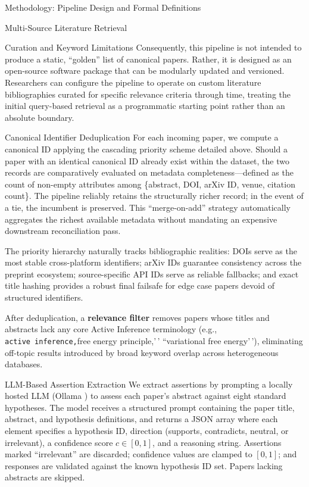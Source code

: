 \documentclass[
  ignorenonframetext,
]{beamer}
\begin{document}
\begin{frame}[fragile]{Methodology: Pipeline Design and Formal
Definitions}
\begin{block}{Multi-Source Literature Retrieval}
\begin{block}{Curation and Keyword Limitations}
Consequently, this pipeline is not intended to produce a static,
``golden'' list of canonical papers. Rather, it is designed as an
open-source software package that can be modularly updated and
versioned. Researchers can configure the pipeline to operate on custom
literature bibliographies curated for specific relevance criteria
through time, treating the initial query-based retrieval as a
programmatic starting point rather than an absolute boundary.
\end{block}
\end{block}

\begin{block}{Canonical Identifier Deduplication}
\protect{}\label{canonical-identifier-deduplication}
For each incoming paper, we compute a canonical ID applying the
cascading priority scheme detailed above. Should a paper with an
identical canonical ID already exist within the dataset, the two records
are comparatively evaluated on metadata completeness---defined as the
count of non-empty attributes among \{abstract, DOI, arXiv ID, venue,
citation count\}. The pipeline reliably retains the structurally richer
record; in the event of a tie, the incumbent is preserved. This
``merge-on-add'' strategy automatically aggregates the richest available
metadata without mandating an expensive downstream reconciliation pass.

The priority hierarchy naturally tracks bibliographic realities: DOIs
serve as the most stable cross-platform identifiers; arXiv IDs guarantee
consistency across the preprint ecosystem; source-specific API IDs serve
as reliable fallbacks; and exact title hashing provides a robust final
failsafe for edge case papers devoid of structured identifiers.

After deduplication, a \textbf{relevance filter} removes papers whose
titles and abstracts lack any core Active Inference terminology (e.g.,
\texttt{active\ inference,\textquotesingle{}\textquotesingle{}}free
energy principle,'\,' ``variational free energy'\,'), eliminating
off-topic results introduced by broad keyword overlap across
heterogeneous databases.
\end{block}

\begin{block}{LLM-Based Assertion Extraction}
\protect{}\label{llm-based-assertion-extraction}
We extract assertions by prompting a locally hosted LLM (Ollama
\citep{ollama2024}) to assess each paper's abstract against eight
standard hypotheses. The model receives a structured prompt containing
the paper title, abstract, and hypothesis definitions, and returns a
JSON array where each element specifies a hypothesis ID, direction
(supports, contradicts, neutral, or irrelevant), a confidence score
\(c \in [0, 1]\), and a reasoning string. Assertions marked
``irrelevant'' are discarded; confidence values are clamped to
\([0, 1]\); and responses are validated against the known hypothesis ID
set. Papers lacking abstracts are skipped.


\end{block}
\end{frame}
\end{document}
